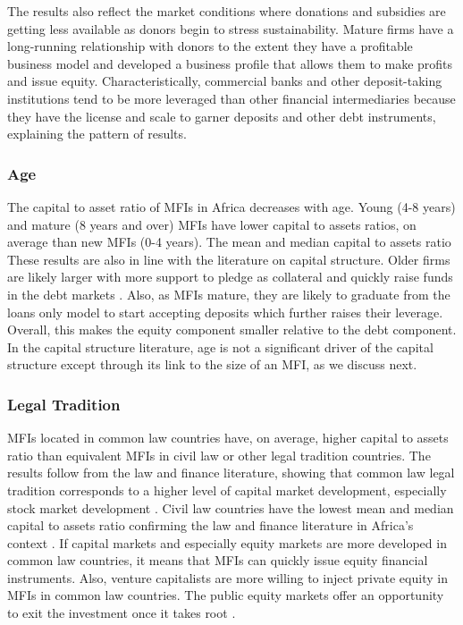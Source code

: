 \documentclass[a4paper, nobind]{templates/ociamthesis}
\begin{document}
The results also reflect the market conditions where donations and subsidies are getting less available as donors begin to stress sustainability. Mature firms have a long-running relationship with donors to the extent they have a profitable business model and developed a business profile that allows them to make profits and issue equity. Characteristically, commercial banks and other deposit-taking institutions tend to be more leveraged than other financial intermediaries because they have the license and scale to garner deposits and other debt instruments, explaining the pattern of results.

\hypertarget{age-3}{%
\subsubsection{Age}\label{age-3}}

The capital to asset ratio of MFIs in Africa decreases with age. Young (4-8 years) and mature (8 years and over) MFIs have lower capital to assets ratios, on average than new MFIs (0-4 years). The mean and median capital to assets ratio These results are also in line with the literature on capital structure. Older firms are likely larger with more support to pledge as collateral and quickly raise funds in the debt markets \autocite{barclay2005capital}. Also, as MFIs mature, they are likely to graduate from the loans only model to start accepting deposits which further raises their leverage. Overall, this makes the equity component smaller relative to the debt component. In the capital structure literature, age is not a significant driver of the capital structure except through its link to the size of an MFI, as we discuss next.

\hypertarget{legal-tradition-2}{%
\subsubsection{Legal Tradition}\label{legal-tradition-2}}

MFIs located in common law countries have, on average, higher capital to assets ratio than equivalent MFIs in civil law or other legal tradition countries. The results follow from the law and finance literature, showing that common law legal tradition corresponds to a higher level of capital market development, especially stock market development \autocite{la2013law}. Civil law countries have the lowest mean and median capital to assets ratio confirming the law and finance literature in Africa's context \autocite{schnyder2018twenty}. If capital markets and especially equity markets are more developed in common law countries, it means that MFIs can quickly issue equity financial instruments. Also, venture capitalists are more willing to inject private equity in MFIs in common law countries. The public equity markets offer an opportunity to exit the investment once it takes root \autocite{kent2013bankers}.
\end{document}

